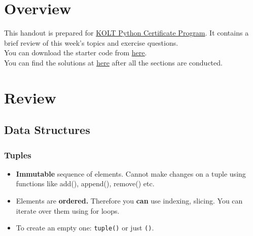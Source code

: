 \documentclass[a4paper]{article}
\author{\contactName\\\href{mailto:\contactMail}{\contactMail}}
\title{\handoutTitle}
\date{Date: \handoutDate}
\begin{document}
\maketitle

\section{Overview}
This handout is prepared for \href{https://koltpython.com}{KOLT Python Certificate Program}. It contains a brief review of this week's topics and exercise questions.\\
You can download the starter code from \href{https://kinolien.github.io/gitzip/?download=koltpython/python-exercises-spring2020/tree/master/section4/starter}{\underline{here}}.\\
You can find the solutions at \href{https://kinolien.github.io/gitzip/?download=koltpython/python-exercises-spring2020/tree/master/section4/solution}{\underline{here}} after all the sections are conducted.

\section{Review}

\subsection{Data Structures}
\subsubsection{Tuples}
\begin{itemize}
    \item \textbf{Immutable} sequence of elements.
    \subitem Cannot make changes on a tuple using functions like add(), append(), remove() etc.
    \item Elements are \textbf{ordered.}
    \subitem Therefore you \textbf{can} use indexing, slicing.
    \subitem You can iterate over them using for loops.
    \item To create an empty one: \texttt{tuple()} or just \texttt{()}.
\end{itemize}
\end{document}
